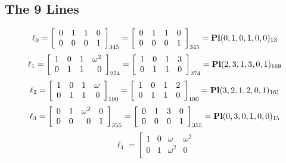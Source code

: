 \documentclass{article}
\begin{document}
{\subsection*{The 9 Lines}
$$
\ell_{0} = 
\left[
\begin{array}{*{4}{r}}
0 & 1 & 1 & 0\\
0 & 0 & 0 & 1\\
\end{array}
\right]
_{345}
=
\left[
\begin{array}{*{4}c}
0  & 1  & 1  & 0\\
0  & 0  & 0  & 1\\
\end{array}
\right]_{345}
={\rm\bf Pl}(0,1,0,1,0,0 )_{13}$$
$$
\ell_{1} = 
\left[
\begin{array}{*{4}{r}}
1 & 0 & 1 & \omega^{2}\\
0 & 1 & 1 & 0\\
\end{array}
\right]
_{274}
=
\left[
\begin{array}{*{4}c}
1  & 0  & 1  & 3\\
0  & 1  & 1  & 0\\
\end{array}
\right]_{274}
={\rm\bf Pl}(2,3,1,3,0,1 )_{169}$$
$$
\ell_{2} = 
\left[
\begin{array}{*{4}{r}}
1 & 0 & 1 & \omega \\
0 & 1 & 1 & 0\\
\end{array}
\right]
_{190}
=
\left[
\begin{array}{*{4}c}
1  & 0  & 1  & 2\\
0  & 1  & 1  & 0\\
\end{array}
\right]_{190}
={\rm\bf Pl}(3,2,1,2,0,1 )_{161}$$
$$
\ell_{3} = 
\left[
\begin{array}{*{4}{r}}
0 & 1 & \omega^{2} & 0\\
0 & 0 & 0 & 1\\
\end{array}
\right]
_{355}
=
\left[
\begin{array}{*{4}c}
0  & 1  & 3  & 0\\
0  & 0  & 0  & 1\\
\end{array}
\right]_{355}
={\rm\bf Pl}(0,3,0,1,0,0 )_{15}$$
$$
\ell_{4} = 
\left[
\begin{array}{*{4}{r}}
1 & 0 & \omega  & \omega^{2}\\
0 & 1 & \omega^{2} & 0\\

\end{array}$$}
\end{document}
